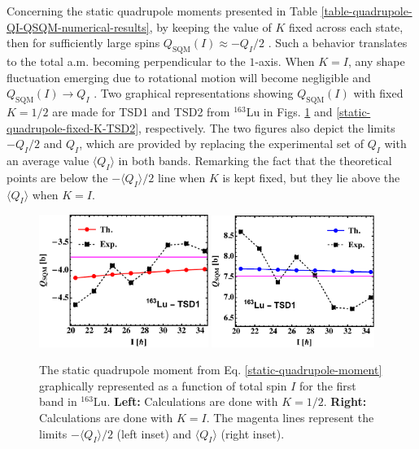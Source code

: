 Concerning the static quadrupole moments presented in Table \ref{table-quadrupole-QI-QSQM-numerical-results}, by keeping the value of $K$ fixed across each state, then for sufficiently large spins $Q_\text{SQM}(I)\approx -Q_I/2$ \cite{bohr1998nuclear}. Such a behavior translates to the total a.m. becoming perpendicular to the $1$-axis. When $K=I$, any shape fluctuation emerging due to rotational motion will become negligible and $Q_\text{SQM}(I) \to Q_I$ \cite{bohr1998nuclear}. Two graphical representations showing $Q_\text{SQM}(I)$ with fixed $K=1/2$ are made for TSD1 and TSD2 from $^{163}$Lu in Figs. \ref{static-quadrupole-fixed-K-TSD1} and \ref{static-quadrupole-fixed-K-TSD2}, respectively. The two figures also depict the limits $-Q_I/2$ and $Q_I$, which are provided by replacing the experimental set of $Q_I$ with an average value $\langle Q_I\rangle$ in both bands. Remarking the fact that the theoretical points are below the $-\langle Q_I\rangle/2$ line when $K$ is kept fixed, but they lie above the $\langle Q_I \rangle $ when $K=I$.
\begin{figure}
    \centering
    \includegraphics[width=0.49\textwidth]{Chapters/Figures/Q_SQM_163Lu.pdf}
    \includegraphics[width=0.47\textwidth]{Chapters/Figures/Q_SQM_163Lu-2.pdf}
    \caption{The static quadrupole moment from Eq. \ref{static-quadrupole-moment} graphically represented as a function of total spin $I$ for the first band in $^{163}$Lu. \textbf{Left:} Calculations are done with $K=1/2$. \textbf{Right:} Calculations are done with $K=I$. The magenta lines represent the limits $-\langle Q_I\rangle/2$ (left inset) and $\langle Q_I\rangle$ (right inset).}
    \label{static-quadrupole-fixed-K-TSD1}
\end{figure}
